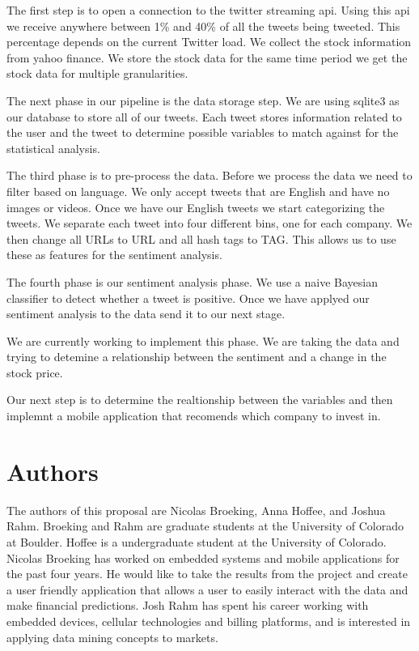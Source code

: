 \documentclass{acm_proc_article-sp}
\begin{document}
The first step is to open a connection to the twitter streaming api. Using this
api we receive anywhere between 1\% and 40\% of all the tweets being tweeted.
This percentage depends on the current Twitter load. We collect the stock
information from yahoo finance. We store the stock data for the same time
period we get the stock data for multiple granularities.

The next phase in our pipeline is the data storage step. We are using sqlite3 as
our database to store all of our tweets. Each tweet stores information
related to the user and the tweet to determine possible variables to match
against for the statistical analysis.

The third phase is to pre-process the data. Before we process the data we need
to filter based on language. We only accept tweets that are English and have no
images or videos. Once we have our English tweets we start categorizing the
tweets. We separate each tweet into four different bins, one for each company.
We then change all URLs to URL and all hash tags to TAG. This allows us to use
these as features for the sentiment analysis. 

The fourth phase is our sentiment analysis phase. We use a naive Bayesian
classifier to detect whether a tweet is positive. Once we have applyed our
sentiment analysis to the data send it to our next stage.

We are currently working to implement this phase. We are taking the data and
trying to detemine a relationship between the sentiment and a change in the
stock price.

Our next step is to determine the realtionship between the variables and then
implemnt a mobile application that recomends which company to invest in. 

\section{Authors}

The authors of this proposal are Nicolas Broeking, Anna
Hoffee, and Joshua Rahm. Broeking and Rahm are graduate students at the
University of Colorado at Boulder. Hoffee is a undergraduate student at the
University of Colorado. Nicolas Broeking has worked on embedded systems and
mobile applications for the past four years. He would like to take the results
from the project and create a user friendly application that allows a user to
easily interact with the data and make financial predictions.  Josh Rahm has
spent his career working with embedded devices, cellular technologies and
billing platforms, and is interested in applying data mining concepts to
markets.  
\end{document}
